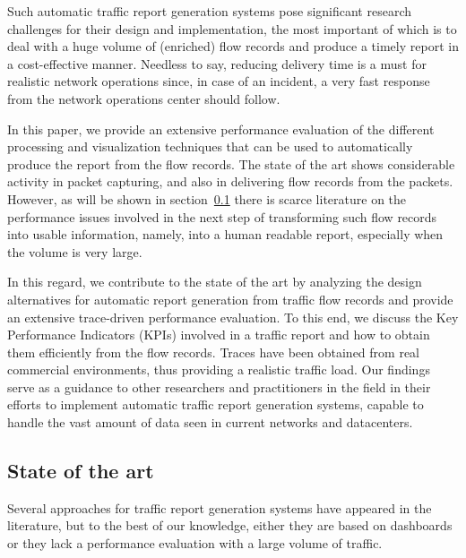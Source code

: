 \documentclass[AMA,STIX1COL]{WileyNJD-v2}
\begin{document}
Such automatic traffic report generation systems pose significant research challenges for their design and implementation, the most important of which is to deal with a huge volume of (enriched) flow records and produce a timely report in a cost-effective manner. Needless to say, reducing delivery time is a must for realistic network operations since, in case of an incident, a very fast response from the network operations center should follow.  

In this paper, we provide an extensive performance evaluation of the different processing and visualization techniques that can be used to automatically produce the report from the flow records. The state of the art shows considerable activity in packet capturing, and also in delivering flow records from the packets. However, as will be shown in  section~\ref{sec:art} there is scarce literature on the performance issues involved in the next step of transforming such flow records into usable information, namely, into a human readable report, especially when the volume is very large.

In this regard, we contribute to the state of the art by analyzing the design alternatives for automatic report generation from traffic flow records and provide an extensive trace-driven performance evaluation. To this end, we discuss the Key Performance Indicators (KPIs) involved in a traffic report and how to obtain them efficiently from the flow records. Traces have been obtained from real commercial environments, thus providing a realistic traffic load. Our findings serve as a guidance to other researchers and practitioners in the field in their efforts to implement automatic traffic report generation systems, capable to handle the vast amount of data seen in current networks and datacenters.

\subsection{State of the art} \label{sec:art}

Several approaches for traffic report generation systems have appeared in the literature, but to the best of our knowledge, either they are based on dashboards or they lack a performance evaluation with a large volume of traffic.
\end{document}

